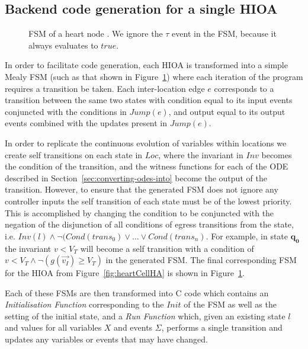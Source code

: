 \subsection{Backend code generation for a single \ac{HIOA}}
\label{sec:backendCodeGeneration}

\begin{figure}
  \centering
  
  \caption{\acf{FSM} of a heart node \label{fig:heartCellFSM}. We ignore
    the $\tau$ event in the \ac{FSM}, because it always evaluates to $true$.}
\end{figure}

In order to facilitate code generation, each \ac{HIOA} is transformed into a 
simple Mealy \ac{FSM} (such as that shown in Figure~\ref{fig:heartCellFSM}) 
where each iteration of the program requires a transition be taken.  Each 
inter-location edge $e$ corresponds to a transition between the same two states 
with condition equal to its input events conjuncted with the conditions in 
$Jump(e)$, and output equal to its output events combined with the updates 
present in $Jump(e)$.

In order to replicate the continuous evolution of variables within locations we 
create self transitions on each state in $Loc$, where the invariant in $Inv$ 
becomes the condition of the transition, and the witness functions for each of 
the \acs{ODE} described in Section~\ref{sec:converting-odes-into} become the 
output of the transition. However, to ensure that the generated \ac{FSM} does 
not ignore any controller inputs the self transition of each state must be of 
the lowest priority.  This is accomplished by changing the condition to be 
conjuncted with the negation of the disjunction of all conditions of egress 
transitions from the state, i.e. $Inv(l) \wedge \neg (Cond(trans_{0}) \vee 
\dots \vee Cond(trans_{n})$.  For example, in state $\mathbf{q_0}$ the 
invariant $v < V_{T}$ will become a self transition with a condition of $v < 
V_{T} \wedge \neg (g(\vec{v_{I}}) \geq V_{T})$ in the generated \ac{FSM}.  The 
final corresponding \ac{FSM} for the \ac{HIOA} from 
Figure~\ref{fig:heartCellHA} is shown in Figure~\ref{fig:heartCellFSM}.

Each of these \acp{FSM} are then transformed into C code which contains an 
\emph{Initialisation Function} corresponding to the $Init$ of the \ac{FSM} as 
well as the setting of the initial state, and a \emph{Run Function} which, 
given an existing state $l$ and values for all variables $X$ and events 
$\Sigma$, performs a single transition and updates any variables or events that 
may have changed.
